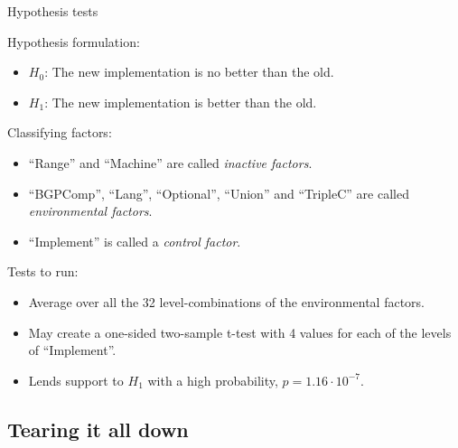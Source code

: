 \documentclass[english,usenames,dvipsnames,aspectratio=169]{beamer}
\begin{document}
\begin{frame}{Hypothesis tests}

Hypothesis formulation:
  \begin{itemize}
  \item $H_0$: The new implementation is no better than the old.
  \item $H_1$: The new implementation is better than the old.
  \end{itemize}

Classifying factors:
  \begin{itemize}
  \item ``Range'' and ``Machine'' are called \emph{inactive factors}.
  \item ``BGPComp'', ``Lang'', ``Optional'', ``Union'' and ``TripleC''
    are called \emph{environmental factors}.
  \item ``Implement'' is called a \emph{control factor}.
  \end{itemize}
  
Tests to run:
\begin{itemize}

\item Average over all the 32 level-combinations of the environmental
  factors. 

\item May create a one-sided two-sample t-test with 4 values for each
  of the levels of ``Implement''.
\item Lends support to $H_1$ with a high probability, $p=1.16 \cdot
10^{-7}$.

\end{itemize}

\end{frame}

\subsection{Tearing it all down}
\end{document}
